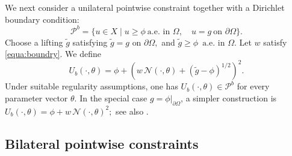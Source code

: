 \documentclass{article}
\numberwithin{equation}{section}
\begin{document}
We next consider a unilateral pointwise constraint together with a Dirichlet
boundary condition:
\begin{equation}
    \mathcal P^b
    =
    \{u\in X\mid u\ge\phi \ \text{a.e. in }\Omega,\quad
    u=g \ \text{on }\partial\Omega\}.
\end{equation}
Choose a lifting $\tilde g$ satisfying $\tilde g=g \text{ on }\partial\Omega,$ and $\tilde g\ge\phi\,\text{ a.e. in }\Omega$. Let $w$ satisfy \eqref{equa:boundry}.
We define
\begin{equation}
    U_b(\cdot,\theta)
    =
    \phi+
    \left(
        w\,\mathcal N(\cdot,\theta)
        +
        (\tilde g-\phi)^{1/2}
    \right)^2 .
    \label{equa:CNP_lowbound_boundary}
\end{equation}
Under suitable regularity assumptions, one has $U_b(\cdot,\theta)\in\mathcal P^b$ for every parameter vector $\theta$. In the special case $g=\phi|_{\partial\Omega}$, a simpler construction is $U_b(\cdot,\theta)
    =
    \phi+w\,\mathcal N(\cdot,\theta)^2;$ see also \cite{song2026single}.

\subsection{Bilateral pointwise constraints}
\end{document}
